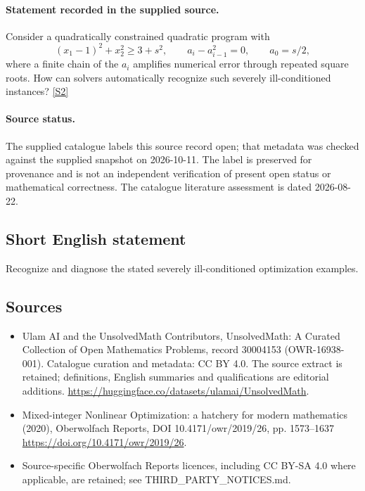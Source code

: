 \documentclass[11pt]{article}
\begin{document}
\paragraph{Statement recorded in the supplied source.}
Consider a quadratically constrained quadratic program with $$ (x_1-1)^2+x_2^2\geq3+s^2,\qquad a_i-a_{i-1}^2=0,\qquad a_0=s/2,$$ where a finite chain of the $a_i$ amplifies numerical error through repeated square roots. How can solvers automatically recognize such severely ill-conditioned instances? \href{https://doi.org/10.4171/owr/2019/26}{[S2]}
\paragraph{Source status.}
The supplied catalogue labels this source record open; that metadata was checked against the supplied snapshot on 2026-10-11. The label is preserved for provenance and is not an independent verification of present open status or mathematical correctness. The catalogue literature assessment is dated 2026-08-22.
\subsection{Short English statement}
Recognize and diagnose the stated severely ill-conditioned optimization examples.
\subsection{Sources}
\begin{itemize}
\item[S1] Ulam AI and the UnsolvedMath Contributors, UnsolvedMath: A Curated Collection of Open Mathematics Problems, record 30004153 (OWR-16938-001). Catalogue curation and metadata: CC BY 4.0. The source extract is retained; definitions, English summaries and qualifications are editorial additions.
\url{https://huggingface.co/datasets/ulamai/UnsolvedMath}.
\item[S2] Mixed-integer Nonlinear Optimization: a hatchery for modern mathematics (2020), Oberwolfach Reports, DOI 10.4171/owr/2019/26, pp. 1573--1637
\url{https://doi.org/10.4171/owr/2019/26}.
\item Source-specific Oberwolfach Reports licences, including CC BY-SA 4.0 where applicable, are retained; see THIRD\_PARTY\_NOTICES.md.
\end{itemize}
\end{document}
